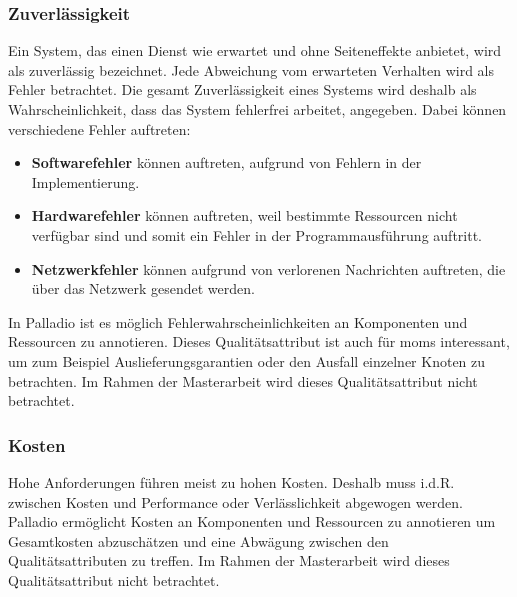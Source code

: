 \subsubsection{Zuverlässigkeit}
Ein System, das einen Dienst wie erwartet und ohne Seiteneffekte anbietet, wird als zuverlässig bezeichnet. Jede Abweichung vom erwarteten Verhalten wird als Fehler betrachtet. Die gesamt Zuverlässigkeit eines Systems wird deshalb als Wahrscheinlichkeit, dass das System fehlerfrei arbeitet, angegeben. Dabei können verschiedene Fehler auftreten:
\begin{itemize}
\item \textbf{Softwarefehler} können auftreten, aufgrund von Fehlern in der Implementierung.
\item \textbf{Hardwarefehler} können auftreten, weil bestimmte Ressourcen nicht verfügbar sind und somit ein Fehler in der Programmausführung auftritt.
\item \textbf{Netzwerkfehler} können aufgrund von verlorenen Nachrichten auftreten, die über das Netzwerk gesendet werden.
\end{itemize}
In Palladio ist es möglich Fehlerwahrscheinlichkeiten an Komponenten und Ressourcen zu annotieren. Dieses Qualitätsattribut ist auch für \gls{mom}s interessant, um zum Beispiel Auslieferungsgarantien oder den Ausfall einzelner Knoten zu betrachten. Im Rahmen der Masterarbeit wird dieses Qualitätsattribut nicht betrachtet.

\subsubsection{Kosten}
Hohe Anforderungen führen meist zu hohen Kosten. Deshalb muss i.d.R. zwischen Kosten und Performance oder Verlässlichkeit abgewogen werden. Palladio ermöglicht Kosten an Komponenten und Ressourcen zu annotieren um Gesamtkosten abzuschätzen und eine Abwägung zwischen den Qualitätsattributen zu treffen. Im Rahmen der Masterarbeit wird dieses Qualitätsattribut nicht betrachtet.

